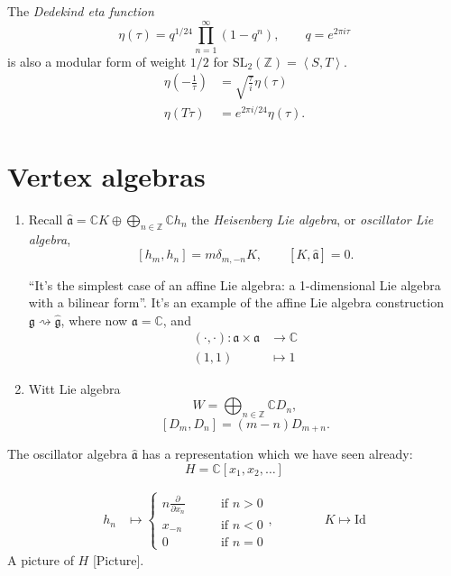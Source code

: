 \begin{theorem}
\label{theorem-dedekind-eta-function}
The {\it Dedekind eta function}
$$
\eta(\tau)=q^{1/24}\prod_{n=1}^\infty
(1-q^n),\qquad q=e^{2\pi i \tau}
$$
is also a modular form of weight $1/2$ for
$\text{SL}_2(\mathbb{Z})=\left\langle{}S,T\right\rangle{}$.
$$
\begin{aligned}
\eta\left(-\frac{1}{\tau}\right)&=
\sqrt{\frac{\tau}{i}}\eta(\tau)\\
\eta(T\tau)&=e^{2\pi i/24}\eta(\tau).
\end{aligned}
$$

\end{theorem}

\section{Vertex algebras}
\label{section-vertex-algebras}

\begin{enumerate}
\item Recall
$\hat{\mathfrak{a}}=\mathbb{C}K\oplus
\bigoplus_{n \in \mathbb{Z}}\mathbb{C}h_n$
the {\it Heisenberg Lie algebra},
or {\it oscillator Lie algebra},
\begin{equation}
\label{equation-bracket-basic}
[h_m,h_n]=m\delta_{m,-n}K,\qquad
[K,\hat{\mathfrak{a}}]=0.
\end{equation}
\begin{remark}
\label{remark-Heisenberg-is-affine}
``It's the simplest case of an affine Lie
algebra: a 1-dimensional
Lie algebra with a bilinear form''. It's an
example of the affine
Lie algebra construction
$\mathfrak{g} \rightsquigarrow
\hat{\mathfrak{g}}$,
where now $\mathfrak{a}=\mathbb{C}$,
and
 $$
\begin{aligned}
(\cdot,\cdot): \mathfrak{a}\times\mathfrak{a}
&\longrightarrow \mathbb{C} \\
(1,1) &\longmapsto 1
\end{aligned}
$$
\end{remark}

\item Witt Lie algebra
$$
W=\bigoplus_{n \in \mathbb{Z}}\mathbb{C}D_n,
$$
$$
[D_m,D_n]=(m-n)D_{m+n}.
$$
\end{enumerate}

\medskip\noindent
The oscillator algebra $\hat{\mathfrak{a}}$
has a representation which we have seen
already:
$$
H=\mathbb{C}[x_1,x_2,\ldots]
$$

\begin{align*}
h_n&\mapsto \begin{cases}
n \frac{\partial }{\partial x_n}\qquad
&\text{if }n>0\\
x_{-n}\qquad &\text{if }n<0\\
0\qquad &\text{if }n=0
\end{cases},
\qquad \qquad  K\mapsto \text{Id}
\end{align*}
A picture of $H$ [Picture].

